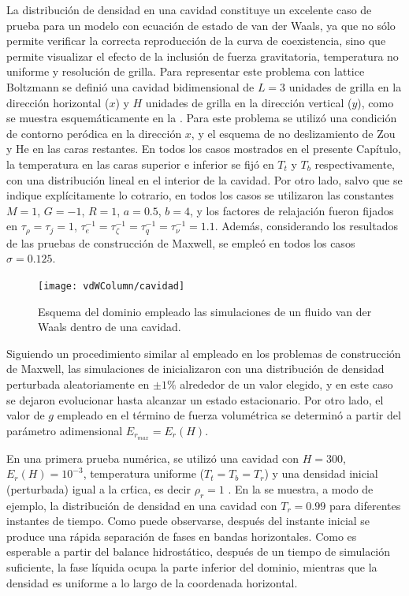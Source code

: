 La distribuci\'on de densidad en una cavidad constituye un excelente caso de prueba para un modelo \pp{} con ecuaci\'on de estado de van der Waals, ya que no s\'olo permite verificar la correcta reproducci\'on de la curva de coexistencia, sino que permite visualizar el efecto de la inclusi\'on de fuerza gravitatoria, temperatura no uniforme y resoluci\'on de grilla. Para representar este problema con lattice Boltzmann se defini\'o una cavidad bidimensional de $L=3$ unidades de grilla en la direcci\'on horizontal ($x$) y $H$ unidades de grilla en la direcci\'on vertical ($y$), como se muestra esquem\'aticamente en la . Para este problema se utiliz\'o una condici\'on de contorno per\'odica en la direcci\'on $x$, y el esquema de no deslizamiento de Zou y He \cite{zou_pressure_1997} en las caras restantes. En todos los casos mostrados en el presente Cap\'itulo, la temperatura en las caras superior e inferior se fij\'o en $T_t$ y $T_b$ respectivamente, con una distribuci\'on lineal en el interior de la cavidad. Por otro lado, salvo que se indique expl\'icitamente lo cotrario, en todos los casos se utilizaron las constantes $M=1$, $G=-1$, $R=1$, $a=0.5$, $b=4$, y los factores de relajaci\'on fueron fijados en $\tau_{\rho} = \tau_j=1$, $\tau_{e}^{-1}=\tau_{\zeta}^{-1}=\tau_{q}^{-1}=\tau_{\nu}^{-1}=1.1$. Adem\'as, considerando los resultados de las pruebas de construcci\'on de Maxwell, se emple\'o en todos los casos $\sigma = 0.125$.

\begin{figure}[ht]
	\centering
	\texttt{[image: vdWColumn/cavidad]}
	\caption{Esquema del dominio empleado las simulaciones de un fluido van der Waals dentro de una cavidad.}
	\label{fig:vdWColumn_cavidad}
\end{figure}

Siguiendo un procedimiento similar al empleado en los problemas de construcci\'on de Maxwell, las simulaciones de inicializaron con una distribuci\'on de densidad perturbada aleatoriamente en $\pm1\%$ alrededor de un valor elegido, y en este caso se dejaron evolucionar hasta alcanzar un estado estacionario. Por otro lado, el valor de $g$ empleado en el t\'ermino de fuerza volum\'etrica se determin\'o a partir del par\'ametro adimensional $E_{r_{max}} = E_r(H)$.

En una primera prueba num\'erica, se utiliz\'o una cavidad con $H=300$, $E_r(H)=10^{-3}$, temperatura uniforme ($T_t = T_b = T_r$) y una densidad inicial (perturbada) igual a la cr\'tica, es decir $\rho_r=1$ . En la  se muestra, a modo de ejemplo, la distribuci\'on de densidad en una cavidad con $T_r=0.99$ para diferentes instantes de tiempo. Como puede observarse, despu\'es del instante inicial se produce una r\'apida separaci\'on de fases en  bandas horizontales. Como es esperable a partir del balance hidrost\'atico, despu\'es de un tiempo de simulaci\'on suficiente, la fase l\'iquida ocupa la parte inferior del dominio, mientras que la densidad es uniforme a lo largo de la coordenada horizontal.

